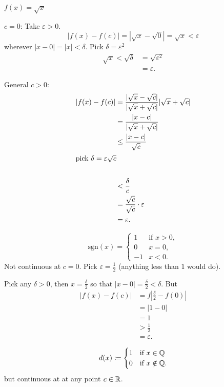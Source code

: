 \documentclass[10pt, a4paper]{article}
\begin{document}
\begin{example}
    $f(x) = \sqrt{x}$

    $c = 0$:
    Take $\varepsilon > 0$.
    \[
    |f(x) - f(c)| = |\sqrt{x} - \sqrt{0}| = \sqrt{x} < \varepsilon
    \]
    wherever $|x - 0| = |x| < \delta$.
    Pick $\delta = \varepsilon ^ 2$
    \begin{align*}
        \sqrt{x} < \sqrt{\delta} &= \sqrt{\varepsilon ^ 2} \\
        &= \varepsilon.
    \end{align*}

    General $c > 0$:
    \begin{align*}
        |f(x) - f(c)| &= \frac{|\sqrt{x} - \sqrt{c}|}{|\sqrt{x} + \sqrt{c}|}|\sqrt{x} + \sqrt{c}| \\
        &= \frac{|x - c|}{|\sqrt{x} + \sqrt{c}|} \\
        &\leq \frac{|x - c|}{\sqrt{c}} \\
        \intertext{pick $\delta = \varepsilon\sqrt{c}$} \\
        &< \frac{\delta}{c} \\
        &= \frac{\sqrt{c}}{\sqrt{c}} \cdot \varepsilon \\
        &= \varepsilon.
    \end{align*}
\end{example}

\begin{example}
    \[
    \mathrm{sgn}(x) = \begin{cases}
        1 & \text{if } x > 0, \\
        0 & x = 0, \\
        -1 & x < 0.
    \end{cases}
    \]
    Not continuous at $c = 0$.
    Pick $\varepsilon = \frac{1}{2}$
    (anything less than $1$ would do).

    Pick any $\delta > 0$,
    then $x = \frac{\delta}{2}$ so that $|x - 0| = \frac{\delta}{2} < \delta$.
    But
    \begin{align*}
        |f(x) - f(c)| &= f\left|\frac{\delta}{2} - f(0)\right| \\
        &= |1 - 0| \\
        &= 1 \\
        &> \frac{1}{2} \\
        &= \varepsilon.
    \end{align*}
\end{example}

\begin{example}
    \[
    d(x) \coloneqq \begin{cases}
        1 & \text{if } x \in \mathbb{Q} \\
        0 & \text{if } x \notin \mathbb{Q}.
    \end{cases}
    \]
    but continuous at at any point $c \in \mathbb{R}$.
\end{example}
\end{document}

